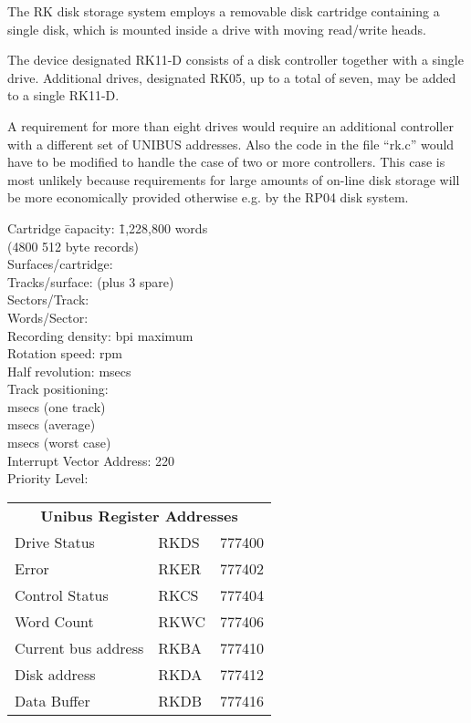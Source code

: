 %
%

The RK disk storage system employs a
removable disk cartridge containing a
single disk, which is mounted inside a
drive with moving read/write heads.

The device designated RK11-D consists
of a disk controller together with a
single drive. Additional drives, designated RK05, up to a total of seven, may
be added to a single RK11-D.

A requirement for more than eight
drives would require an additional controller with a different set of UNIBUS
addresses. Also the code in the file
``rk.c'' would have to be modified to
handle the case of two or more controllers. This case is most unlikely
because requirements for large amounts
of on-line disk storage will be more
economically provided otherwise e.g.
by the RP04 disk system.


\begin{center}
\begin{tabbing}
Cartridge \= capacity: \= 1,228,800 words\\
\> (4800 512 byte records)\\
Surfaces/cartridge: \> \\
Tracks/surface: \>  (plus 3 spare)\\
Sectors/Track: \> \\
Words/Sector: \> \\
Recording density: \>  bpi maximum\\
Rotation speed: \>  rpm\\
Half revolution: \>  msecs\\
Track positioning:\\
 msecs (one track)\\
 msecs (average)\\
 msecs (worst case)\\
Interrupt Vector Address: 220\\
Priority Level: \> \\
\end{tabbing}
\end{center}

\begin{tabular}{lll}
\multicolumn{3}{c}{\bf Unibus Register Addresses}\\
Drive Status        & RKDS & 777400 \\
Error               & RKER & 777402 \\
Control Status      & RKCS & 777404 \\
Word Count          & RKWC & 777406 \\
Current bus address & RKBA & 777410 \\
Disk address        & RKDA & 777412 \\
Data Buffer         & RKDB & 777416 \\
\end{tabular}

